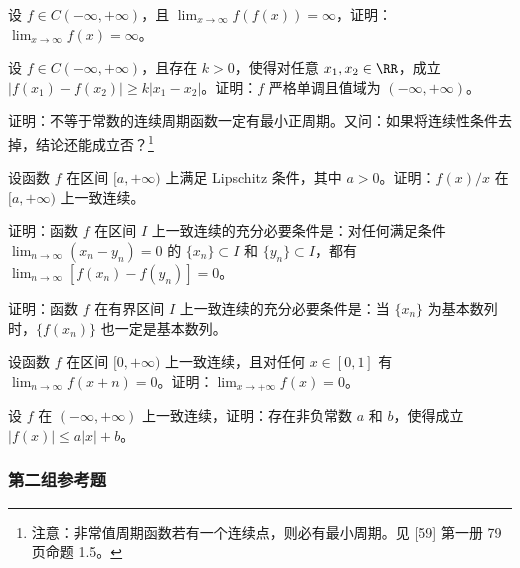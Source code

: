 \begin{xreferenceproblem}[13]
设 $f\in C(-\infty,+\infty)$，且 $\lim_{x\to\infty}f(f(x))=\infty$，证明：$\lim_{x\to\infty}f(x)=\infty$。
\end{xreferenceproblem}

\begin{xreferenceproblem}[14]
设 $f\in C(-\infty,+\infty)$，且存在 $k>0$，使得对任意 $x_1,x_2\in\RR$，成立 $|f(x_1)-f(x_2)|\ge k|x_1-x_2|$。证明：$f$ 严格单调且值域为 $(-\infty,+\infty)$。
\end{xreferenceproblem}

\begin{xreferenceproblem}[15]
证明：不等于常数的连续周期函数一定有最小正周期。又问：如果将连续性条件去掉，结论还能成立否？\footnote{注意：非常值周期函数若有一个连续点，则必有最小周期。见 [59] 第一册 79 页命题 1.5。}
\end{xreferenceproblem}

\begin{xreferenceproblem}[16]
设函数 $f$ 在区间 $[a,+\infty)$ 上满足 Lipschitz 条件，其中 $a>0$。证明：$f(x)/x$ 在 $[a,+\infty)$ 上一致连续。
\end{xreferenceproblem}

\begin{xreferenceproblem}[17]
证明：函数 $f$ 在区间 $I$ 上一致连续的充分必要条件是：对任何满足条件 $\lim_{n\to\infty}(x_n-y_n)=0$ 的 $\{x_n\}\subset I$ 和 $\{y_n\}\subset I$，都有 $\lim_{n\to\infty}[f(x_n)-f(y_n)]=0$。
\end{xreferenceproblem}

\begin{xreferenceproblem}[18]
证明：函数 $f$ 在有界区间 $I$ 上一致连续的充分必要条件是：当 $\{x_n\}$ 为基本数列时，$\{f(x_n)\}$ 也一定是基本数列。
\end{xreferenceproblem}

\begin{xreferenceproblem}[19]
设函数 $f$ 在区间 $[0,+\infty)$ 上一致连续，且对任何 $x\in[0,1]$ 有 $\lim_{n\to\infty}f(x+n)=0$。证明：$\lim_{x\to+\infty}f(x)=0$。
\end{xreferenceproblem}

\begin{xreferenceproblem}[20]
设 $f$ 在 $(-\infty,+\infty)$ 上一致连续，证明：存在非负常数 $a$ 和 $b$，使得成立 $|f(x)|\le a|x|+b$。
\end{xreferenceproblem}

\subsubsection*{第二组参考题}


